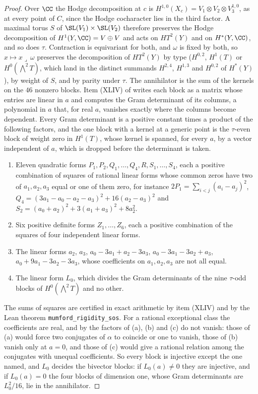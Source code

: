 \begin{proof}
Over $\CC$ the Hodge decomposition at $c$ is
$H^{1,0}(X_{c})=V_{1}\otimes V_{2}\otimes V_{3}^{1,0}$, as at every point of
$C$, since the Hodge cocharacter lies in the third factor. A maximal torus
$S$ of $\SL(V_{1})\times\SL(V_{2})$ therefore preserves the Hodge
decomposition of $H^{1}(Y,\CC)=V\oplus V$ and acts on $HT^{2}(Y)$ and on
$H^{*}(Y,\CC)$, and so does $\tau$. Contraction is equivariant for both, and
$\omega$ is fixed by both, so $x\mapsto x\lrcorner\,\omega$ preserves the
decomposition of $HT^{2}(Y)$ by type ($H^{0,2}$, $H^{1}(T)$ or
$H^{0}(\bigwedge^{2}T)$, which land in the distinct summands $H^{2,4}$,
$H^{1,3}$ and $H^{0,2}$ of $H^{*}(Y)$), by weight of $S$, and by parity under
$\tau$. The annihilator is the sum of the kernels on the $46$ nonzero
blocks. Item (XLIV) of  writes each block as a matrix
whose entries are linear in $a$ and computes the Gram determinant of its
columns, a polynomial in $a$ that, for real $a$, vanishes exactly where the
columns become dependent. Every Gram determinant is a positive constant times a product of
the following factors, and the one block with a kernel at a generic point is
the $\tau$-even block of weight zero in $H^{1}(T)$, whose kernel is spanned,
for every $a$, by a vector independent of $a$, which is dropped before the
determinant is taken.
\begin{enumerate}[label=\textup{(\alph*)},leftmargin=2.6em,itemsep=1pt]
\item Eleven quadratic forms $P_{1},P_{2},Q_{1},\dots,Q_{4},R,S_{1},\dots,
  S_{4}$, each a positive combination of squares of rational linear forms
  whose common zeros have two of $a_{1},a_{2},a_{3}$ equal or one of them
  zero, for instance
  $2P_{1}=\sum_{i<j}(a_{i}-a_{j})^{2}$,
  $Q_{4}=(3a_{1}-a_{0}-a_{2}-a_{3})^{2}+16(a_{2}-a_{3})^{2}$ and
  $S_{2}=(a_{0}+a_{2})^{2}+3(a_{1}+a_{3})^{2}+8a_{2}^{2}$.
\item Six positive definite forms $Z_{1},\dots,Z_{6}$, each a positive
  combination of the squares of four independent linear forms.
\item The linear forms $a_{2}$, $a_{3}$, $a_{0}-3a_{1}+a_{2}-3a_{3}$,
  $a_{0}-3a_{1}-3a_{2}+a_{3}$, $a_{0}+9a_{1}-3a_{2}-3a_{3}$, whose
  coefficients on $a_{1},a_{2},a_{3}$ are not all equal.
\item The linear form $L_{0}$, which divides the Gram determinants of the
  nine $\tau$-odd blocks of $H^{0}(\bigwedge^{2}T)$ and no other.
\end{enumerate}
The sums of squares are certified in exact arithmetic by item (XLIV) and by
the Lean theorem \texttt{mumford\_rigidity\_sos}. For a rational exceptional
class the coefficients are real, and by  the factors of
(a), (b) and (c) do not vanish: those of (a) would force two conjugates of
$\alpha$ to coincide or one to vanish, those of (b) vanish only at $a=0$,
and those of (c) would give a rational relation among the conjugates with
unequal coefficients. So every block is injective except the one named, and
$L_{0}$ decides the bivector blocks: if $L_{0}(a)\ne0$ they are injective, and
if $L_{0}(a)=0$ the four blocks of dimension one, whose Gram determinants are
$L_{0}^{2}/16$, lie in the annihilator.


\end{proof}
